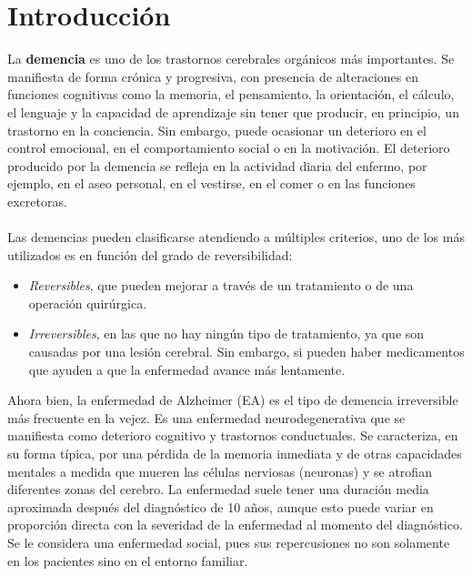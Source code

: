 \documentclass[smallextended, 12pt]{article}
\begin{document}
	\section{Introducci\'on}
	La \textbf{demencia} es uno de los trastornos cerebrales org\'anicos m\'as importantes. Se manifiesta de forma cr\'onica y progresiva, con presencia de alteraciones en funciones cognitivas como la memoria, el pensamiento, la orientaci\'on, el c\'alculo, el lenguaje y la capacidad de aprendizaje sin tener que producir, en principio, un trastorno en la conciencia. Sin embargo, puede ocasionar un deterioro en el control emocional, en el comportamiento social o en la motivaci\'on. El deterioro producido por la demencia se refleja en la actividad diaria del enfermo, por ejemplo, en el aseo personal, en el vestirse, en el comer o en las funciones excretoras. \cite{ref3}\\
	\\
	Las demencias pueden clasificarse atendiendo a m\'ultiples criterios, uno de los m\'as utilizados es en funci\'on del grado de reversibilidad:
	\begin{itemize}
		\item \textit{Reversibles}, que pueden mejorar a trav\'es de un tratamiento o de una operaci\'on quir\'urgica.
		\item \textit{Irreversibles}, en las que no hay ning\'un tipo de tratamiento, ya que son causadas por una lesi\'on cerebral. Sin embargo, si pueden haber medicamentos que ayuden a que la enfermedad avance m\'as lentamente. \cite{ref3}
	\end{itemize} 	
	Ahora bien, la enfermedad de Alzheimer (EA) es el tipo de demencia irreversible m\'as frecuente en la vejez. Es una enfermedad neurodegenerativa que se manifiesta como deterioro cognitivo y trastornos conductuales. Se caracteriza, en su forma t\'ipica, por una p\'erdida de la memoria inmediata y de otras capacidades mentales a medida que mueren las c\'elulas nerviosas (neuronas) y se atrofian diferentes zonas del cerebro. La enfermedad suele tener una duraci\'on media aproximada despu\'es del diagn\'ostico de 10 a\~nos, aunque esto puede variar en proporci\'on directa con la severidad de la enfermedad al momento del diagn\'ostico. Se le considera una enfermedad social, pues sus repercusiones no son solamente en los pacientes sino en el entorno familiar. \cite{ref3} \cite{ref4}
		
	
\end{document}
